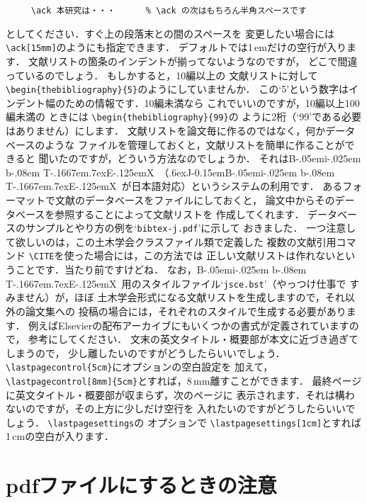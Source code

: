 \documentclass[dvipdfmx,onecolumn]{jsce}  %
\def\BibTeX{{\rm B\kern-.05em{\sc i\kern-.025em b}\kern-.08em
    T\kern-.1667em\lower.7ex\hbox{E}\kern-.125emX}}
\def\JBibTeX{\leavevmode\lower .6ex\hbox{J}\kern-0.15em\BibTeX}
\begin{document}
\begin{Enumerate}
\renewcommand{\baselinestretch}{0.75}\small\normalsize
\begin{verbatim}
     \ack 本研究は・・・      % \ack の次はもちろん半角スペースです
\end{verbatim}
\renewcommand{\baselinestretch}{1}\small\normalsize
としてください．すぐ上の段落末との間のスペースを
変更したい場合には \verb+\ack[15mm]+のようにも指定できます．
デフォルトでは1\,emだけの空行が入ります．
%
\Qitem 文献リストの箇条のインデントが揃ってないようなのですが，
どこで間違っているのでしょう．
\Aitem もしかすると，10編以上の
文献リストに対して \verb+\begin{thebibliography}{5}+のようにしていませんか．
この`5'という数字はインデント幅のための情報です．10編未満なら
これでいいのですが，10編以上100編未満の
ときには \verb+\begin{thebibliography}{99}+の
ように2桁（`99'である必要はありません）にします．
%
\Qitem 文献リストを論文毎に作るのではなく，何かデータベースのような
ファイルを管理しておくと，文献リストを簡単に作ることができると
聞いたのですが，どういう方法なのでしょうか．
\Aitem それは\BibTeX\ （\JBibTeX\ が日本語対応）というシステムの利用です．
あるフォーマットで文献のデータベースをファイルにしておくと，
論文中からそのデータベースを参照することによって文献リストを
作成してくれます．
データベースのサンプルとやり方の例を`{\tt bibtex-j.pdf}'に示して
おきました．
一つ注意して欲しいのは，この土木学会クラスファイル類で定義した
複数の文献引用コマンド \verb+\CITE+を使った場合には，この方法では
正しい文献リストは作れないということです．当たり前ですけどね．
なお，\BibTeX\ 用のスタイルファイル`{\tt jsce.bst}'（やっつけ仕事で
すみません）が，ほぼ
土木学会形式になる文献リストを生成しますので，それ以外の論文集への
投稿の場合には，それぞれのスタイルで生成する必要があります．
例えばElsevierの配布アーカイブにもいくつかの書式が定義されていますので，
参考にしてください．
%
\Qitem 文末の英文タイトル・概要部が本文に近づき過ぎてしまうので，
少し離したいのですがどうしたらいいでしょう．
\Aitem \verb+\lastpagecontrol{5cm}+にオプションの空白設定を
加えて，\verb+\lastpagecontrol[8mm]{5cm}+とすれば，8\,mm離すことができます．
%
\Qitem 最終ページに英文タイトル・概要部が収まらず，次のページに
表示されます．それは構わないのですが，その上方に少しだけ空行を
入れたいのですがどうしたらいいでしょう．
\Aitem \verb+\lastpagesettings+の
オプションで \verb+\lastpagesettings[1cm]+とすれば1\,cmの空白が入ります．
%
\end{Enumerate}

\section{pdfファイルにするときの注意}
\end{document}
